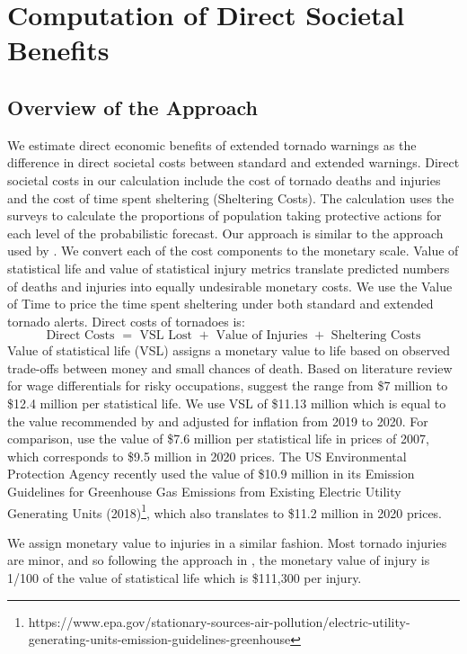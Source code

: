 \documentclass{ametsocV6.1}
\begin{document}
\vspace{20pt}
\section{Computation of Direct Societal Benefits}
\vspace{10pt}
\subsection{Overview of the Approach} 

We estimate direct economic benefits of extended tornado warnings as the difference in direct societal costs between standard and extended warnings. Direct societal costs in our calculation include the cost of tornado deaths and injuries and the cost of time spent sheltering (Sheltering Costs). The calculation uses the surveys to calculate the proportions of population taking protective actions for each level of the probabilistic forecast. Our approach is similar to the approach used by \citet{simmons_economic_2013}. We convert each of the cost components to the monetary scale. Value of statistical life and value of statistical injury metrics translate predicted numbers of deaths and injuries into equally undesirable monetary costs. We use the Value of Time to price the time spent sheltering under both standard and extended tornado alerts. Direct costs of tornadoes is:
$$\mbox{Direct Costs }=\mbox{ VSL Lost }+\mbox{ Value of Injuries }+\mbox{ Sheltering Costs}$$
Value of statistical life (VSL) assigns a monetary value to life based on observed trade-offs between money and small chances of death. Based on literature review for wage differentials for risky occupations, \citet{viscusi_value_2003} suggest the range from \$7 million to \$12.4 million per statistical life. We use VSL of \$11.13 million which is equal to the value recommended by \citet{kniesner_value_2019} and adjusted for inflation from 2019 to 2020. For comparison, \citet{simmons_economic_2013} use the value of \$7.6 million per statistical life in prices of 2007, which corresponds to \$9.5 million in 2020 prices.  The US Environmental Protection Agency recently used the value of \$10.9 million in its Emission Guidelines for Greenhouse Gas Emissions from Existing Electric Utility Generating Units (2018)\footnote{https://www.epa.gov/stationary-sources-air-pollution/electric-utility-generating-units-emission-guidelines-greenhouse}, which also translates to \$11.2 million in 2020 prices.

We  assign monetary value to injuries in a similar fashion. Most tornado injuries are minor, and so following the approach in \citep*{simmons_direct_2006, simmons_economic_2013}, the monetary value of injury is 1/100 of the value of statistical life which is \$111,300 per injury.
\end{document}
